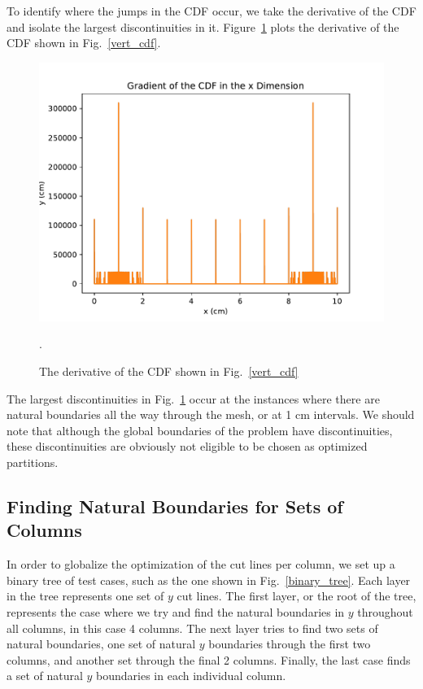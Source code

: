 To identify where the jumps in the CDF occur, we take the derivative of the CDF and isolate the largest discontinuities in it. Figure~\ref{gradcdf} plots the derivative of the CDF shown in Fig.~\ref{vert_cdf}.
\begin{figure}[h]
\centering
\includegraphics[scale=0.75]{../figures/gradcdf.pdf}
\caption{The derivative of the CDF shown in Fig.~\ref{vert_cdf}}.
\label{gradcdf}
\end{figure}
The largest discontinuities in Fig.~\ref{gradcdf} occur at the instances where there are natural boundaries all the way through the mesh, or at 1 cm intervals.
We should note that although the global boundaries of the problem have discontinuities, these discontinuities are obviously not eligible to be chosen as optimized partitions. 

\FloatBarrier
\subsection{Finding Natural Boundaries for Sets of Columns}
In order to globalize the optimization of the cut lines per column, we set up a binary tree of test cases, such as the one shown in Fig.~\ref{binary_tree}. Each layer in the tree represents one set of $y$ cut lines. The first layer, or the root of the tree, represents the case where we try and find the natural boundaries in $y$ throughout all columns, in this case 4 columns. The next layer tries to find two sets of natural boundaries, one set of natural $y$ boundaries through the first two columns, and another set through the final 2 columns. Finally, the last case finds a set of natural $y$ boundaries in each individual column.

